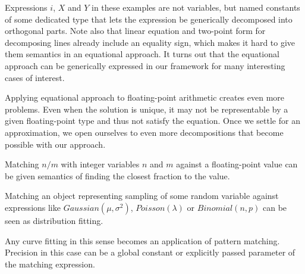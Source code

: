 \noindent
Expressions $i$, $X$ and $Y$ in these examples are not variables, but named 
constants of some dedicated type that lets the expression be generically 
decomposed into orthogonal parts. Note also that linear equation and two-point 
form for decomposing lines already include an equality sign, which makes it 
hard to give them semantics in an equational approach. It turns out that the 
equational approach can be generically expressed in our framework for many 
interesting cases of interest.

Applying equational approach to floating-point arithmetic creates even more 
problems. Even when the solution is unique, it may not be representable by 
a given floating-point type and thus not satisfy the equation. Once we settle 
for an approximation, we open ourselves to even more decompositions that become 
possible with our approach.

\begin{compactitem}
\setlength{\itemsep}{0pt}
\setlength{\parskip}{0pt}
\item Matching $n/m$ with integer variables $n$ and $m$ against a floating-point 
      value can be given semantics of finding the closest fraction to the 
      value.
\item Matching an object representing sampling of some random variable against
      expressions like $Gaussian(\mu,\sigma^2)$, $Poisson(\lambda)$ or 
      $Binomial(n,p)$ can be seen as distribution fitting. 
\item Any curve fitting in this sense becomes an application of pattern 
      matching. Precision in this case can be a global constant or explicitly 
      passed parameter of the matching expression.
\end{compactitem}



